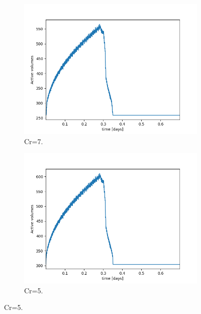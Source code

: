\documentclass[professionalfont]{beamer}
\begin{document}
\begin{frame}{\FrameProblemName}
    \begin{figure}[!htbp]
        \centering
        \caption{Volumes Ativos.}
        \begin{subfigure}{.48\textwidth}
            \centering
            \includegraphics[scale=0.4]{./imgs/pr4/active_vols_cr7.png}
            \caption{Cr=7.}
        \end{subfigure}
        \hfill
        \begin{subfigure}{.48\textwidth}
            \centering
            \includegraphics[scale=0.4]{./imgs/pr4/active_vols_cr5.png}
            \caption{Cr=5.}
        \end{subfigure}
    
        \label{fig:fig6_pr4}
    \end{figure}
\end{frame}
\end{document}
